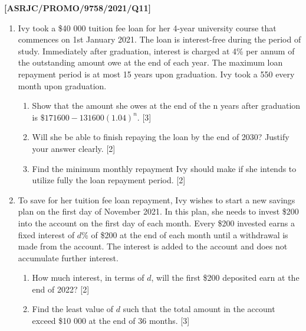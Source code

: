 \item \textbf{{[}ASRJC/PROMO/9758/2021/Q11{]}}
\begin{enumerate}
\item Ivy took a \$40 000 tuition fee loan for her 4-year university course
that commences on 1st January 2021. The loan is interest-free during
the period of study. Immediately after graduation, interest is charged
at 4\% per annum of the outstanding amount owe at the end of each
year. The maximum loan repayment period is at most 15 years upon graduation.
Ivy took a 550 every month upon graduation.
\begin{enumerate}
\item Show that the amount she owes at the end of the n years after graduation
is $\$171600-131600\left(1.04\right)^{n}$. \hfill{}{[}3{]}
\item Will she be able to finish repaying the loan by the end of 2030? Justify
your answer clearly. \hfill{}{[}2{]}
\item Find the minimum monthly repayment Ivy should make if she intends
to utilize fully the loan repayment period. \hfill{} {[}2{]}
\end{enumerate}
\item To save for her tuition fee loan repayment, Ivy wishes to start a
new savings plan on the first day of November 2021. In this plan,
she needs to invest \$200 into the account on the first day of each
month. Every \$200 invested earns a fixed interest of $d$\% of \$200
at the end of each month until a withdrawal is made from the account.
The interest is added to the account and does not accumulate further
interest. 
\begin{enumerate}
\item How much interest, in terms of $d$, will the first \$200 deposited
earn at the end of 2022? \hfill{}{[}2{]}
\item Find the least value of $d$ such that the total amount in the account
exceed \$10 000 at the end of 36 months. \hfill{} {[}3{]}
\end{enumerate}
\end{enumerate}